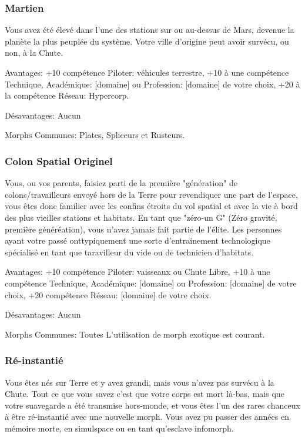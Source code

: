 \subsubsection{Martien} \label{sec:martian} 

Vous avez été élevé dans l'une des stations sur ou au-dessus de Mars, devenue la planète la plus peuplée du système. Votre ville d'origine peut avoir survécu, ou non, à la Chute. 

Avantages: +10 compétence Piloter: véhicules terrestre, +10 à une compétence Technique, Académique: [domaine] ou Profession: [domaine] de votre choix, +20 à la compétence Réseau: Hypercorp. 

Désavantages: Aucun 

Morphs Communes: Plates, Spliceurs et Rusteurs. 

\subsubsection{Colon Spatial Originel} \label{sec:original-space-colonist} 

Vous, ou vos parents, faisiez parti de la première "génération" de colons/travailleurs envoyé hors de la Terre pour revendiquer une part de l'espace, vous êtes donc familier avec les confins étroits du vol spatial et avec la vie à bord des plus vieilles stations et habitats. En tant que "zéro-un G" (Zéro gravité, première généréation), vous n'avez jamais fait partie de l'élite. Les personnes ayant votre passé onttypiquement une sorte d'entrainement technologique spécialisé en tant que taravilleur du vide ou de technicien d'habitats. 

Avantages: +10 compétence Piloter: vaisseaux ou Chute Libre, +10 à une compétence Technique, Académique: [domaine] ou Profession: [domaine] de votre choix, +20 compétence Réseau: [domaine] de votre choix. 

Désavantages: Aucun 

Morphs Communes: Toutes L'utilisation de morph exotique est courant. 

\subsubsection{Ré-instantié} \label{sec:re-instantiated} 

Vous êtes nés sur Terre et y avez grandi, mais vous n'avez pas survécu à la Chute. Tout ce que vous savez c'est que votre corps est mort là-bas, mais que votre suavegarde a été transmise hors-monde, et vous êtes l'un des rares chanceux à être ré-instantié avec une nouvelle morph. Vous avez pu passer des années en mémoire morte, en simulspace ou en tant qu'esclave infomorph. 

